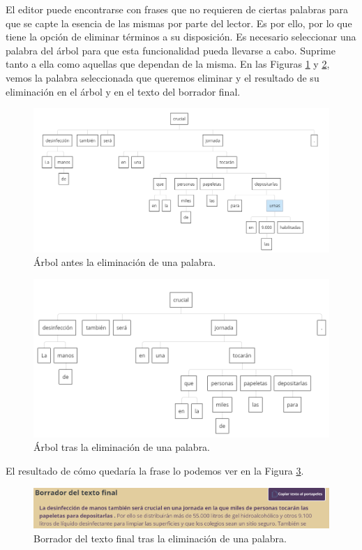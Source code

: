 El editor puede encontrarse con frases que no requieren de ciertas palabras para que se capte la esencia de las mismas por parte del lector. Es por ello, por lo que tiene la opción de eliminar términos a su disposición. Es necesario seleccionar una palabra del árbol para que esta funcionalidad pueda llevarse a cabo. Suprime tanto a ella como aquellas que dependan de la misma. En las Figuras \ref{fig:eliminacionPrevia} y \ref{fig:eliminacion}, vemos la palabra seleccionada que queremos eliminar y el resultado de su eliminación en el árbol y en el texto del borrador final.
	 \begin{figure}[h!]
	\centering
	
	
	\includegraphics[scale=0.6]{Imagenes/Figuras/Eliminacion1}
	
	
	\caption{Árbol antes la eliminación de una palabra.}
	\label{fig:eliminacionPrevia}
\end{figure} 
	 \begin{figure}[h!]
	\centering
	
	
	\includegraphics[scale=0.7]{Imagenes/Figuras/Eliminacion2}
	
	
	\caption{Árbol tras la eliminación de una palabra.}
	\label{fig:eliminacion}
\end{figure} 
El resultado de cómo quedaría la frase lo podemos ver en la Figura \ref{fig:resultadoEliminar}.
	 \begin{figure}[h!]
	\centering
	
	
	\includegraphics[scale=0.7]{Imagenes/Figuras/BorradorEliminacion}
	
	
	\caption{Borrador del texto final tras la eliminación de una palabra.}
	\label{fig:resultadoEliminar}
\end{figure} 

